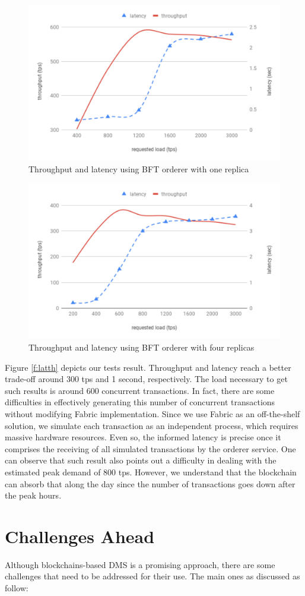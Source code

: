 \documentclass[journal]{IEEEtran}
\begin{document}
\begin{figure}[!t]
\centering
\includegraphics[width=.45\textwidth]{chartbft1r} %
\caption{Throughput and latency using BFT orderer with one replica}
\label{f:latthbft1}
\end{figure}

\begin{figure}[!t]
\centering
\includegraphics[width=.45\textwidth]{chartbft4r} %
\caption{Throughput and latency using BFT orderer with four replicas}
\label{f:latthbft4}
\end{figure}

Figure \ref{f:latth} depicts our tests result.
Throughput and latency reach a better trade-off around 300 tps and 1 second, respectively.
The load necessary to get such results is around 600 concurrent transactions.
In fact, there are some difficulties in effectively generating this number of concurrent transactions without modifying Fabric implementation.
Since we use Fabric as an off-the-shelf solution, we simulate each transaction as an independent process, which requires massive hardware resources.
Even so, the informed latency is precise once it comprises the receiving of all simulated transactions by the orderer service.
One can observe that such result also points out a difficulty in dealing with the estimated peak demand of 800 tps.
However, we understand that the blockchain can absorb that along the day since the number of transactions goes down after the peak hours.

\section{Challenges Ahead}
Although blockchains-based DMS is a promising approach, there are some challenges that need to be addressed for their use. The main ones as discussed as follow:
\end{document}
